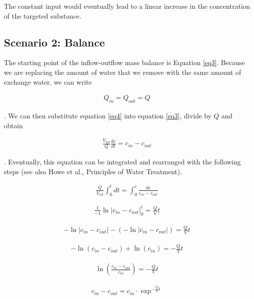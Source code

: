 \documentclass{scrartcl}
\begin{document}
The constant input would eventually lead to a linear increase in the concentration of the targeted substance.



\subsection{Scenario 2: Balance}
The starting point of the inflow-outflow mass balance is Equation \ref{eq3}. Because we are replacing the amount of water that we remove with the same amount of exchange water, we can write

\begin{align}
	Q_{in} = Q_{out} = Q
	\label{eq4}
\end{align}

. We can then substitute equation \ref{eq4} into equation \ref{eq3}, divide by $Q$ and obtain

\begin{align}
	\frac{V_{tot}}{Q} \frac{dc}{dt} = c_{in} - c_{out}
\end{align}

. Eventually, this equation can be integrated and rearranged with the following steps (see also Howe et al., Principles of Water Treatment).

\begin{align}
	\frac{Q}{V_{tot}} \int_{0}^{t} dt = \int_{0}^{c} \frac{dc}{c_{in} - c_{out}} 
\end{align}

\begin{align}
	\frac{1}{-1}\ln|c_{in} - c_{out}|_{0}^{c} = \frac{Q}{V}t
\end{align}

\begin{align}
	-\ln|c_{in} - c_{out}|-(-\ln|c_{in} - c_{out}|) = \frac{Q}{V}t
\end{align}

\begin{align}
	-\ln(c_{in} - c_{out})+\ln(c_{in}) = -\frac{Q}{V}t
\end{align}

\begin{align}
	\ln (\frac{c_{in}-c_{out}}{c_{in}}) = -\frac{Q}{V}t
\end{align}

\begin{align}
	c_{in} - c_{out} = c_{in} \cdot \exp^{-\frac{Q}{V}t}
\end{align}
\end{document}
